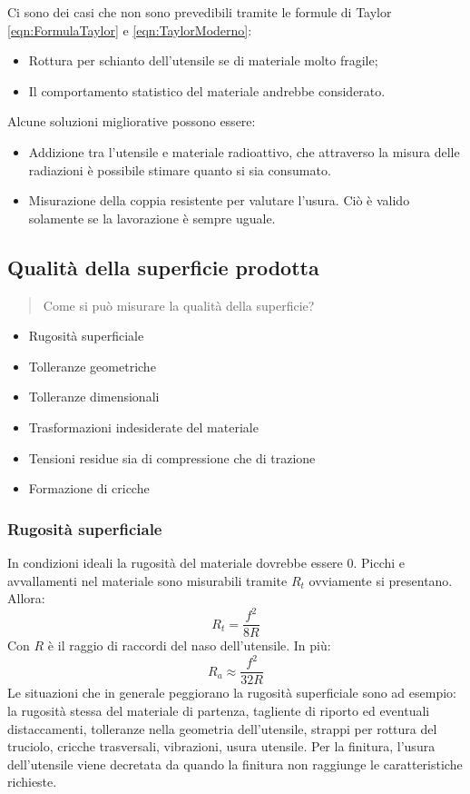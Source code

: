 Ci sono dei casi che non sono prevedibili tramite le formule di Taylor \eqref{eqn:FormulaTaylor} e \eqref{eqn:TaylorModerno}:
\begin{itemize}
\item Rottura per schianto dell'utensile se di materiale molto fragile;
\item Il comportamento statistico del materiale andrebbe considerato.
\end{itemize}

Alcune soluzioni migliorative possono essere:
\begin{itemize}
\item Addizione tra l'utensile e materiale radioattivo, che attraverso la misura delle radiazioni è possibile stimare quanto si sia consumato.
\item Misurazione della coppia resistente per valutare l'usura. Ciò è valido solamente se la lavorazione è sempre uguale.
\end{itemize}

\subsection{Qualità della superficie prodotta}
\begin{quote}
Come si può misurare la qualità della superficie?
\end{quote}

\begin{itemize}
\item Rugosità superficiale
\item Tolleranze geometriche
\item Tolleranze dimensionali
\item Trasformazioni indesiderate del materiale
\item Tensioni residue sia di compressione che di trazione 
\item Formazione di cricche
\end{itemize}

\subsubsection{Rugosità superficiale}
In condizioni ideali la rugosità del materiale dovrebbe essere 0.
Picchi e avvallamenti nel materiale sono misurabili tramite $R_t$ ovviamente si presentano.
Allora:
\begin{equation}
R_t = \frac{f^2}{8R}
\end{equation}
Con $R$ è il raggio di raccordi del naso dell'utensile.
In più:
\begin{equation}
R_a \approx \frac{f^2}{32R}
\end{equation}
Le situazioni che in generale peggiorano la rugosità superficiale sono ad esempio: la rugosità stessa del materiale di partenza, tagliente di riporto ed eventuali distaccamenti, tolleranze nella geometria dell'utensile, strappi per rottura del truciolo, cricche trasversali, vibrazioni, usura utensile.
Per la finitura, l'usura dell'utensile viene decretata da quando la finitura non raggiunge le caratteristiche richieste.

